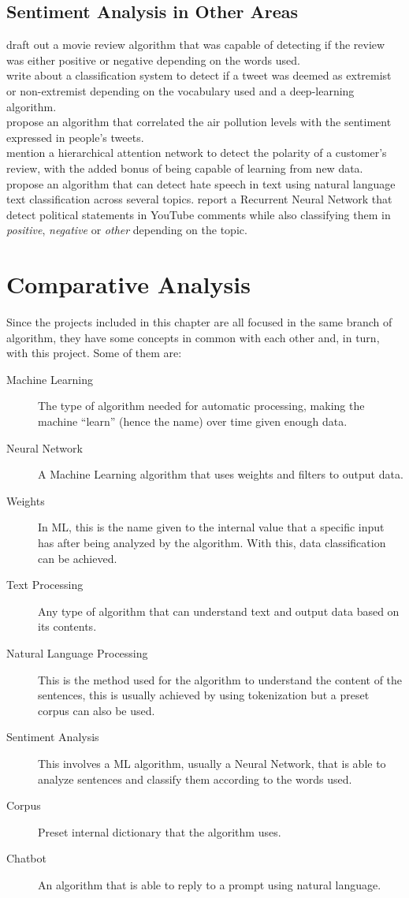 \subsection{Sentiment Analysis in Other Areas}
\citet{rf5} draft out a movie review algorithm that was capable of detecting if the review was either positive or negative depending on the words used.\\
\citet{rf11} write about a classification system to detect if a tweet was deemed as extremist or non-extremist depending on the vocabulary used and a deep-learning algorithm.\\
\citet{rf12} propose an algorithm that correlated the air pollution levels with the sentiment expressed in people's tweets.\\
\citet{rf13} mention a hierarchical attention network to detect the polarity of a customer's review, with the added bonus of being capable of learning from new data.
\citet{rf15} propose an algorithm that can detect hate speech in text using natural language text classification across several topics.
\citet{rf16} report a Recurrent Neural Network that detect political statements in YouTube comments while also classifying them in \textit{positive}, \textit{negative} or \textit{other} depending on the topic.

\section{Comparative Analysis}
Since the projects included in this chapter are all focused in the same branch of algorithm, they have some concepts in common with each other and, in turn, with this project. Some of them are:
\begin{description}
	\item[Machine Learning]{The type of algorithm needed for automatic processing, making the machine ``learn'' (hence the name) over time given enough data.}
	\item[Neural Network]{A Machine Learning algorithm that uses weights and filters to output data.}
	\item[Weights]{In ML, this is the name given to the internal value that a specific input has after being analyzed by the algorithm. With this, data classification can be achieved.}
	\item[Text Processing]{Any type of algorithm that can understand text and output data based on its contents.}
	\item[Natural Language Processing]{This is the method used for the algorithm to understand the content of the sentences, this is usually achieved by using tokenization but a preset corpus can also be used.}	
	\item[Sentiment Analysis]{This involves a ML algorithm, usually a Neural Network, that is able to analyze sentences and classify them according to the words used.}
	\item[Corpus]{Preset internal dictionary that the algorithm uses.}
	\item[Chatbot]{An algorithm that is able to reply to a prompt using natural language.}
\end{description}

